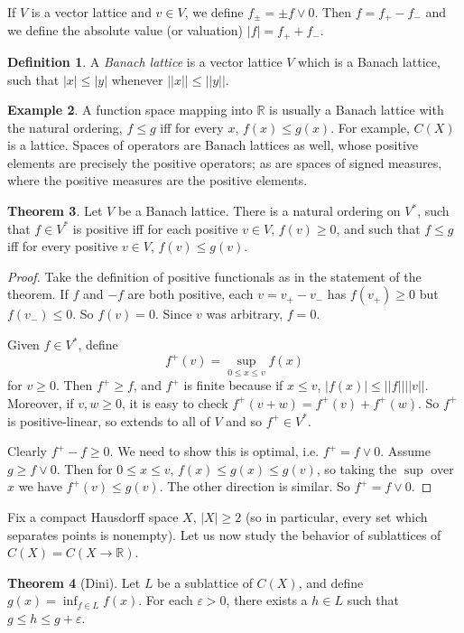 \documentclass[12pt]{report}
\newcommand{\RR}{\mathbb{R}}
\newcommand{\dfn}[1]{\emph{#1}\index{#1}}
\theoremstyle{definition}
\newtheorem{theorem}{Theorem}[chapter]
\newtheorem{definition}[theorem]{Definition}
\newtheorem{example}[theorem]{Example}
\begin{document}
    If $V$ is a vector lattice and $v \in V$, we define $f_\pm = \pm f \vee 0$. Then $f = f_+ - f_-$ and we define the absolute value (or valuation) $|f| = f_+ + f_-$.
\begin{definition}
    A \dfn{Banach lattice} is a vector lattice $V$ which is a Banach lattice, such that $|x| \leq |y|$ whenever $||x|| \leq ||y||$.
\end{definition}
\begin{example}
    A function space mapping into $\RR$ is usually a Banach lattice with the natural ordering, $f \leq g$ iff for every $x$, $f(x) \leq g(x)$. For example, $C(X)$ is a lattice. Spaces of operators are Banach lattices as well, whose positive elements are precisely the positive operators; as are spaces of signed measures, where the positive measures are the positive elements.
\end{example}
\begin{theorem}
    Let $V$ be a Banach lattice. There is a natural ordering on $V^*$, such that $f \in V^*$ is positive iff for each positive $v \in V$, $f(v) \geq 0$, and such that $f \leq g$ iff for every positive $v \in V$, $f(v) \leq g(v)$.
\end{theorem}
\begin{proof}
    Take the definition of positive functionals as in the statement of the theorem. If $f$ and $-f$ are both positive, each $v = v_+ - v_-$ has $f(v_+) \geq 0$ but $f(v_-) \leq 0$. So $f(v) = 0$. Since $v$ was arbitrary, $f = 0$.

    Given $f \in V^*$, define
    $$f^+(v) = \sup_{0 \leq x \leq v} f(x)$$
    for $v \geq 0$. Then $f^+ \geq f$, and $f^+$ is finite because if $x \leq v$, $|f(x)| \leq ||f|| ||v||$. Moreover, if $v, w \geq 0$, it is easy to check $f^+(v+w) = f^+(v) + f^+(w)$. So $f^+$ is positive-linear, so extends to all of $V$ and so $f^+ \in V^*$.

    Clearly $f^+ - f \geq 0$. We need to show this is optimal, i.e. $f^+ = f \vee 0$. Assume $g \geq f \vee 0$. Then for $0 \leq x \leq v$, $f(x) \leq g(x) \leq g(v)$, so taking the $\sup$ over $x$ we have $f^+(v) \leq g(v)$. The other direction is similar. So $f^+ = f \vee 0$.
\end{proof}
    Fix a compact Hausdorff space $X$, $|X| \geq 2$ (so in particular, every set which separates points is nonempty). Let us now study the behavior of sublattices of $C(X) = C(X \to \RR)$.
\begin{theorem}[Dini]
    Let $L$ be a sublattice of $C(X)$, and define $g(x) = \inf_{f \in L} f(x)$. For each $\varepsilon > 0$, there exists a $h \in L$ such that $g \leq h \leq g + \varepsilon$.
\end{theorem}
\end{document}
